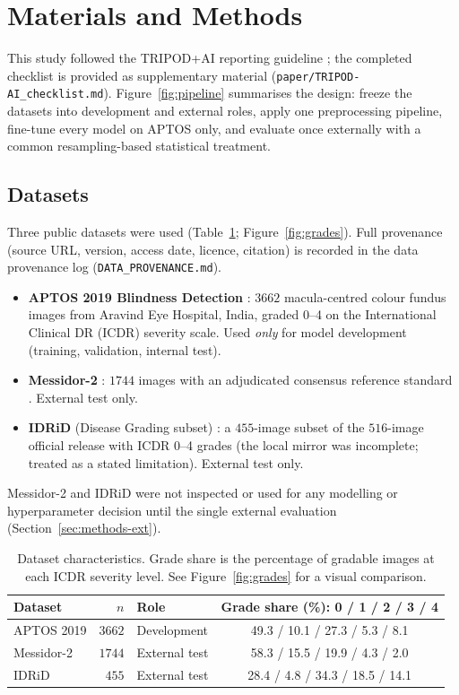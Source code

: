 \documentclass[journal]{IEEEtran}
\begin{document}
\section{Materials and Methods}
\label{sec:methods}

This study followed the TRIPOD+AI reporting guideline \cite{tripodai2024}; the
completed checklist is provided as supplementary material
(\texttt{paper/TRIPOD-AI\_checklist.md}). Figure~\ref{fig:pipeline} summarises the
design: freeze the datasets into development and external roles, apply one
preprocessing pipeline, fine-tune every model on APTOS only, and evaluate once
externally with a common resampling-based statistical treatment.

\subsection{Datasets}
\label{sec:methods-data}

Three public datasets were used (Table~\ref{tab:datasets};
Figure~\ref{fig:grades}). Full provenance (source URL, version, access date,
licence, citation) is recorded in the data provenance log
(\texttt{DATA\_PROVENANCE.md}).

\begin{itemize}
  \item \textbf{APTOS 2019 Blindness Detection} \cite{aptos2019}: $3662$
    macula-centred colour fundus images from Aravind Eye Hospital, India, graded
    0--4 on the International Clinical DR (ICDR) severity scale. Used
    \emph{only} for model development (training, validation, internal test).
  \item \textbf{Messidor-2} \cite{decenciere2014,abramoff2013}: $1744$ images
    with an adjudicated consensus reference standard \cite{krause2018}. External
    test only.
  \item \textbf{IDRiD} (Disease Grading subset) \cite{porwal2018,porwal2020}: a
    $455$-image subset of the $516$-image official release with ICDR 0--4 grades
    (the local mirror was incomplete; treated as a stated limitation). External
    test only.
\end{itemize}

Messidor-2 and IDRiD were not inspected or used for any modelling or
hyperparameter decision until the single external evaluation
(Section~\ref{sec:methods-ext}).

\begin{table}[!t]
\centering\small
\caption{Dataset characteristics. Grade share is the percentage of gradable
images at each ICDR severity level. See Figure~\ref{fig:grades} for a visual
comparison.}
\label{tab:datasets}
\begin{tabular}{lrlc}
\toprule
Dataset & $n$ & Role & Grade share (\%): 0 / 1 / 2 / 3 / 4 \\
\midrule
APTOS 2019 & $3662$ & Development   & 49.3 / 10.1 / 27.3 / 5.3 / 8.1 \\
Messidor-2 & $1744$ & External test & 58.3 / 15.5 / 19.9 / 4.3 / 2.0 \\
IDRiD      & $455$  & External test & 28.4 / 4.8 / 34.3 / 18.5 / 14.1 \\
\bottomrule
\end{tabular}
\end{table}
\end{document}
